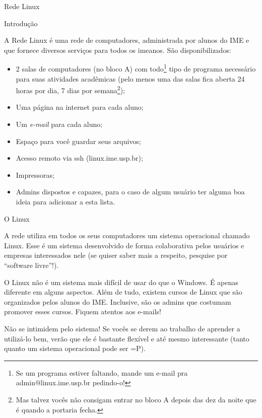 \begin{subsecao}{Rede Linux}


\begin{subsubsecao}{Introdução}

A Rede Linux é uma rede de computadores, administrada por alunos do IME e
que fornece diversos serviços para todos os imeanos.
São disponibilizados:

\vspace{-1em}

\begin{itemize}
\item 2 salas de computadores (no bloco A) com todo\footnote{ Se um programa
estiver faltando, mande um e-mail pra admin@linux.ime.usp.br pedindo-o!} tipo de
programa necessário para suas atividades acadêmicas (pelo menos uma das salas fica
aberta 24 horas por dia, 7 dias por semana\footnote{ Mas talvez vocês não
consigam entrar no bloco A depois das dez da noite que é quando a portaria
fecha.});
\item Uma página na internet para cada aluno;
\item Um \textit{e-mail} para cada aluno;
\item Espaço para você guardar seus arquivos;
\item Acesso remoto via ssh (linux.ime.usp.br);
\item Impressoras;
\item Admins dispostos e capazes, para o caso de algum usuário ter alguma boa
ideia para adicionar a esta lista.
\end{itemize}
\end{subsubsecao}

\begin{subsubsecao}{O Linux}

A rede utiliza em todos os seus computadores um sistema operacional chamado
Linux. Esse é um sistema desenvolvido de forma colaborativa pelos usuários
e empresas interessados nele (se quiser saber mais a respeito, pesquise
por ``software livre''!).

O Linux não é um sistema mais difícil de usar do que o Windows. É apenas
diferente em alguns aspectos. Além de tudo, existem cursos de Linux que são
organizados pelos alunos do IME. Inclusive, são os admins que costumam promover 
esses cursos. Fiquem atentos aos e-mails!

Não se intimidem pelo sistema! Se vocês se derem ao trabalho de
aprender a utilizá-lo bem, verão que ele é bastante flexível e até mesmo
interessante (tanto quanto um sistema operacional pode ser =P).


\end{subsubsecao}
\end{subsecao}
